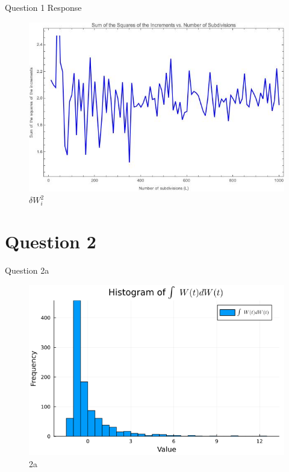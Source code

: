 \documentclass[compress,12pt]{beamer}
\begin{document}
\begin{frame}{Question 1 Response}

      \begin{figure}[H]
      \centering
      \includegraphics[scale=0.32]{imgs/SqrSum.jpeg}
      \caption{$\delta W_i^2$}
      \label{fig:sqrsum}
      \end{figure}

\end{frame}
\section{Question 2}
\begin{frame}{Question 2a}

      \begin{figure}[H]
            \centering
            \includegraphics[scale=0.5]{imgs/2a.png}
            \caption{2a}
            \label{fig:2a}
      \end{figure}

\end{frame}
\end{document}
